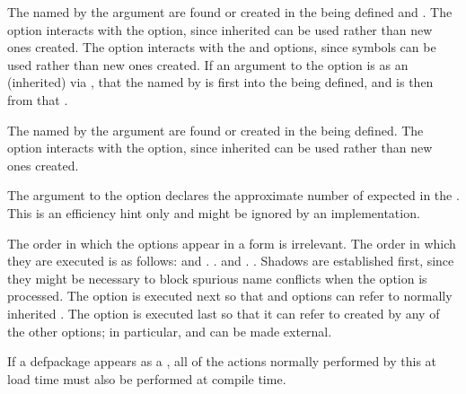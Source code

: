 
The  named by
the argument   are found 
or created in the  being defined
and .
The  option interacts
with the  option, since inherited  
        can be used rather than new ones created.
The  option interacts
        with the 
 and  options, since 
symbols can be used rather than new ones created.
If an argument to the  option is  as
an (inherited)  via , that the
 named by 
is first  into the  being
defined, and is then  from that .
 

The  named by the argument  
are found or created in the  being defined.
The  option interacts with the 
 option, since inherited  
can be used rather than new ones created.  


The argument to the  option
declares the approximate number of  expected in the 
.
        This is an efficiency hint only and might be ignored by an
implementation.
\endlist
 
The order in which the options appear in a 
 form is irrelevant.
The order in which they are executed is as follows:
\beginlist
{}
 and .
. 
 and .
.
\endlist
Shadows are established first, since they might  be necessary to block 
spurious name conflicts when the  
option is processed. The  option is executed
next so that  and  options can refer to normally 
inherited .  
The  option is executed last so that it can refer to 
 created by any of the other options; in 
particular,  and 
  can be made external.  
 
If a {defpackage}  appears as a ,
all of the actions normally performed by this  
at load time must also be performed at compile time.

